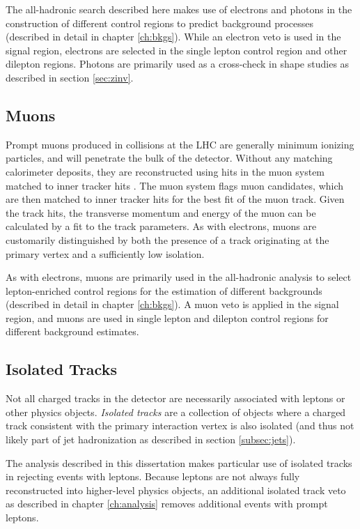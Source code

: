 The all-hadronic search described here makes use of electrons and photons in the construction of different control regions to predict background processes (described in detail in chapter \ref{ch:bkgs}). While an electron veto is used in the signal region, electrons are selected in the single lepton control region and other dilepton regions. Photons are primarily used as a cross-check in \mttwo shape studies as described in section \ref{sec:zinv}.

\subsection{Muons}
\label{subsec:muons}
Prompt muons produced in collisions at the LHC are generally minimum ionizing particles, and will penetrate the bulk of the detector. Without any matching calorimeter deposits, they are reconstructed using hits in the muon system matched to inner tracker hits \cite{Chatrchyan:2009ae}. The muon system flags muon candidates, which are then matched to inner tracker hits for the best fit of the muon track. Given the track hits, the transverse momentum and energy of the muon can be calculated by a fit to the track parameters. As with electrons, muons are customarily distinguished by both the presence of a track originating at the primary vertex and a sufficiently low isolation.

As with electrons, muons are primarily used in the all-hadronic analysis to select lepton-enriched control regions for the estimation of different backgrounds (described in detail in chapter \ref{ch:bkgs}). A muon veto is applied in the signal region, and muons are used in single lepton and dilepton control regions for different background estimates.

\subsection{Isolated Tracks}
\label{subsec:isotrack}
Not all charged tracks in the detector are necessarily associated with leptons or other physics objects. {\it Isolated tracks} are a collection of objects where a charged track consistent with the primary interaction vertex is also isolated (and thus not likely part of jet hadronization as described in section \ref{subsec:jets}).

The analysis described in this dissertation makes particular use of isolated tracks in rejecting events with leptons. Because leptons are not always fully reconstructed into higher-level physics objects, an additional isolated track veto as described in chapter \ref{ch:analysis} removes additional events with prompt leptons.

